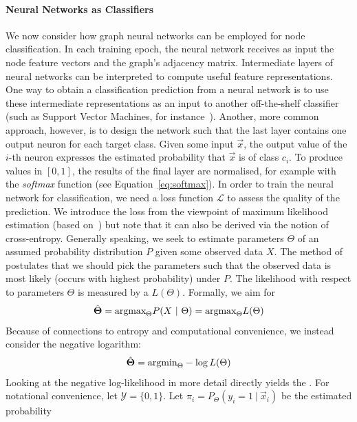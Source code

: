 \documentclass[
	fontsize=10pt, %
	twoside=true, %
	secnumdepth=1, %
  toc=indentunnumbered %
]{kaobook}
\begin{document}
\paragraph{Neural Networks as Classifiers} We now consider how graph neural
networks can be employed for node classification. In each training epoch, the
neural network receives as input the node feature vectors and the graph's
adjacency matrix.
%
Intermediate layers of neural
networks can be interpreted to compute useful feature representations. One way
to obtain a classification prediction from a neural network is to use these
intermediate representations as an input to another off-the-shelf classifier
(such as Support Vector Machines, for instance~\cite{liu_CombiningConvolutionalNeural_2018}). Another, more common approach,
however, is to design the network such that the last layer contains one output
neuron for each target class. Given some input $\vec x$, the output value of the
$i$-th neuron expresses the estimated probability that $\vec x$ is of class
$c_i$. To produce values in $[0,1]$, the results of the final layer are
normalised, for example with the \textit{softmax} function (see Equation~\ref{eq:softmax}).
%
In order to train the neural network for classification, we need a loss function
$\mathcal{L}$ to assess the quality of the prediction. We introduce the
 loss from the viewpoint of maximum likelihood
estimation (based on~\cite{zhang_dive_nodate}) but note that it can also be
derived via the notion of cross-entropy.
%
Generally speaking, we seek to estimate parameters $\Theta$ of an assumed
probability distribution $P$ given some observed data $X$. The method of
 postulates that we should pick the
parameters such that the observed data is most likely (occurs with highest
probability) under $P$. The likelihood with respect to parameters $\Theta$ is measured by
a  $L(\Theta)$.
Formally, we aim for
\begin{align*}
  \hat \Theta = \argmax_\Theta P(X~|~\Theta) = \argmax_\Theta L(\Theta)
\end{align*}
Because of connections to entropy and computational convenience, we instead
consider the negative logarithm:
\begin{align*}
  \hat \Theta = \argmin_\Theta -\log L(\Theta)
\end{align*}
Looking at the negative log-likelihood in more detail directly yields the
.
For notational convenience, let $\mathcal{Y} =
\{0,1\}$. Let $\pi_i = P_\Theta(y_i=1~|~\vec x_i)$ be the estimated probability
\end{document}
